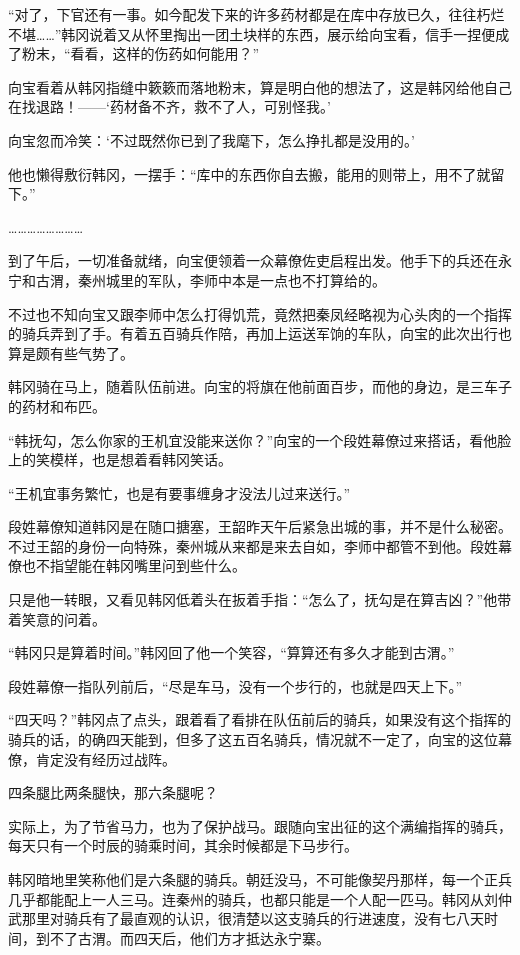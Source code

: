 “对了，下官还有一事。如今配发下来的许多药材都是在库中存放已久，往往朽烂不堪……”韩冈说着又从怀里掏出一团土块样的东西，展示给向宝看，信手一捏便成了粉末，“看看，这样的伤药如何能用？”

向宝看着从韩冈指缝中簌簌而落地粉末，算是明白他的想法了，这是韩冈给他自己在找退路！——‘药材备不齐，救不了人，可别怪我。’

向宝忽而冷笑：‘不过既然你已到了我麾下，怎么挣扎都是没用的。’

他也懒得敷衍韩冈，一摆手：“库中的东西你自去搬，能用的则带上，用不了就留下。”

……………………

到了午后，一切准备就绪，向宝便领着一众幕僚佐吏启程出发。他手下的兵还在永宁和古渭，秦州城里的军队，李师中本是一点也不打算给的。

不过也不知向宝又跟李师中怎么打得饥荒，竟然把秦凤经略视为心头肉的一个指挥的骑兵弄到了手。有着五百骑兵作陪，再加上运送军饷的车队，向宝的此次出行也算是颇有些气势了。

韩冈骑在马上，随着队伍前进。向宝的将旗在他前面百步，而他的身边，是三车子的药材和布匹。

“韩抚勾，怎么你家的王机宜没能来送你？”向宝的一个段姓幕僚过来搭话，看他脸上的笑模样，也是想着看韩冈笑话。

“王机宜事务繁忙，也是有要事缠身才没法儿过来送行。”

段姓幕僚知道韩冈是在随口搪塞，王韶昨天午后紧急出城的事，并不是什么秘密。不过王韶的身份一向特殊，秦州城从来都是来去自如，李师中都管不到他。段姓幕僚也不指望能在韩冈嘴里问到些什么。

只是他一转眼，又看见韩冈低着头在扳着手指：“怎么了，抚勾是在算吉凶？”他带着笑意的问着。

“韩冈只是算着时间。”韩冈回了他一个笑容，“算算还有多久才能到古渭。”

段姓幕僚一指队列前后，“尽是车马，没有一个步行的，也就是四天上下。”

“四天吗？”韩冈点了点头，跟着看了看排在队伍前后的骑兵，如果没有这个指挥的骑兵的话，的确四天能到，但多了这五百名骑兵，情况就不一定了，向宝的这位幕僚，肯定没有经历过战阵。

四条腿比两条腿快，那六条腿呢？

实际上，为了节省马力，也为了保护战马。跟随向宝出征的这个满编指挥的骑兵，每天只有一个时辰的骑乘时间，其余时候都是下马步行。

韩冈暗地里笑称他们是六条腿的骑兵。朝廷没马，不可能像契丹那样，每一个正兵几乎都能配上一人三马。连秦州的骑兵，也都只能是一个人配一匹马。韩冈从刘仲武那里对骑兵有了最直观的认识，很清楚以这支骑兵的行进速度，没有七八天时间，到不了古渭。而四天后，他们方才抵达永宁寨。


